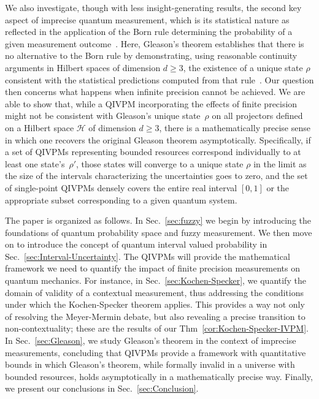 \documentclass[english,reprint, aps, prl,superscriptaddress, showpacs,
showkeys, longbibliography, amsmath, amssymb, floatfix]{revtex4-1}
\theoremstyle{plain}
\theoremstyle{definition}
\newcommand{\Hilb}{\mathcal{H}}
\begin{document}
We also investigate, though with less insight-generating results, the
second key aspect of imprecise quantum measurement, which is its
statistical nature as reflected in the application of the Born rule
determining the probability of a given measurement
outcome~\citep{Born1983,peres1995quantum,544199}.  Here, Gleason's
theorem establishes that there is no alternative to the Born rule by
demonstrating, using reasonable continuity arguments in Hilbert spaces
of dimension $d\ge3$, the existence of a unique state $\rho$
consistent with the statistical predictions computed from that
rule~\citep{gleason1957,Redhead1987-REDINA,peres1995quantum}.  Our
question then concerns what happens when infinite precision cannot be
achieved.  We are able to show that, while a QIVPM incorporating the
effects of finite precision might not be consistent with Gleason's
unique state~$\rho$ on all projectors defined on a Hilbert space
$\Hilb$ of dimension $d\ge3$, there is a mathematically precise sense
in which one recovers the original Gleason theorem asymptotically.
Specifically, if a set of QIVPMs representing bounded resources
correspond individually to at least one state's~$\rho'$, those states
will converge to a unique state $\rho$ in the limit as the size of the intervals
characterizing the uncertainties goes to zero, and the set of
single-point QIVPMs densely covers the entire real interval $[0,1]$ or the
appropriate subset corresponding to a given quantum system.


The paper is organized as follows.  In Sec.~\ref{sec:fuzzy} we begin
by introducing the foundations of quantum probability space and fuzzy
measurement.  We then move on to introduce the concept of quantum
interval valued probability in Sec.~\ref{sec:Interval-Uncertainty}.
The QIVPMs will provide the mathematical framework we need to quantify the
impact of finite precision measurements on quantum mechanics.  For
instance, in Sec.~\ref{sec:Kochen-Specker}, we quantify the domain of
validity of a contextual measurement, thus addressing the conditions
under which the Kochen-Specker theorem applies.  This provides a way
not only of resolving the Meyer-Mermin debate, but also revealing a
precise transition to non-contextuality;  these are the results of our
Thm~\ref{cor:Kochen-Specker-IVPM}.  In Sec.~\ref{sec:Gleason}, we
study Gleason's theorem in the context of imprecise measurements,
concluding that QIVPMs provide a framework with quantitative bounds in
which Gleason's theorem, while formally invalid in a universe with
bounded resources, holds asymptotically in a mathematically precise
way.  Finally, we present our conclusions in Sec.~\ref{sec:Conclusion}.
\end{document}
